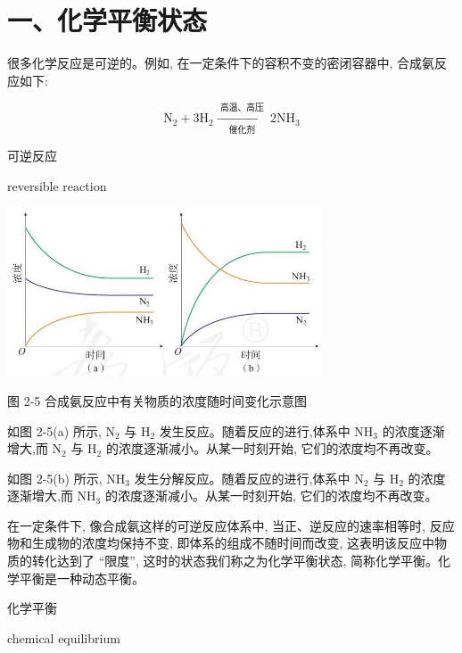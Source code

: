 \documentclass[10pt]{article}
\begin{document}
\section*{一、化学平衡状态}

很多化学反应是可逆的。例如, 在一定条件下的容积不变的密闭容器中, 合成氨反应如下:

\[
{\mathrm{N}}_{2} + 3{\mathrm{H}}_{2}\xrightarrow[\text{ 催化剂 }]{\text{ 高温、高压 }}2{\mathrm{{NH}}}_{3}
\]

\begin{mdframed}

可逆反应

reversible reaction

\end{mdframed}

\begin{center}
\includegraphics[max width=0.7\textwidth]{images/0190da9d-8bfd-732f-bc2c-0b21d0f13b91_37_494672.jpg}
\end{center}

图 2-5 合成氨反应中有关物质的浓度随时间变化示意图

如图 2-5(a) 所示, \({\mathrm{N}}_{2}\) 与 \({\mathrm{H}}_{2}\) 发生反应。随着反应的进行,体系中 \({\mathrm{{NH}}}_{3}\) 的浓度逐渐增大,而 \({\mathrm{N}}_{2}\) 与 \({\mathrm{H}}_{2}\) 的浓度逐渐减小。从某一时刻开始, 它们的浓度均不再改变。

如图 2-5(b) 所示, \({\mathrm{{NH}}}_{3}\) 发生分解反应。随着反应的进行,体系中 \({\mathrm{N}}_{2}\) 与 \({\mathrm{H}}_{2}\) 的浓度逐渐增大,而 \({\mathrm{{NH}}}_{3}\) 的浓度逐渐减小。从某一时刻开始, 它们的浓度均不再改变。

在一定条件下, 像合成氨这样的可逆反应体系中, 当正、逆反应的速率相等时, 反应物和生成物的浓度均保持不变, 即体系的组成不随时间而改变, 这表明该反应中物质的转化达到了 “限度”, 这时的状态我们称之为化学平衡状态, 简称化学平衡。化学平衡是一种动态平衡。

\begin{mdframed}

化学平衡

chemical equilibrium

\end{mdframed}
\end{document}
